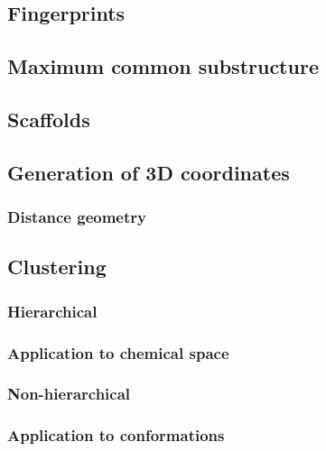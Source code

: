 \subsection{Fingerprints}

\subsection{Maximum common substructure}

\subsection{Scaffolds}

\subsection{Generation of 3D coordinates}

\subsubsection{Distance geometry}

\subsection{Clustering}

\subsubsection{Hierarchical}

\subsubsection{Application to chemical space}

\subsubsection{Non-hierarchical}

\subsubsection{Application to conformations}